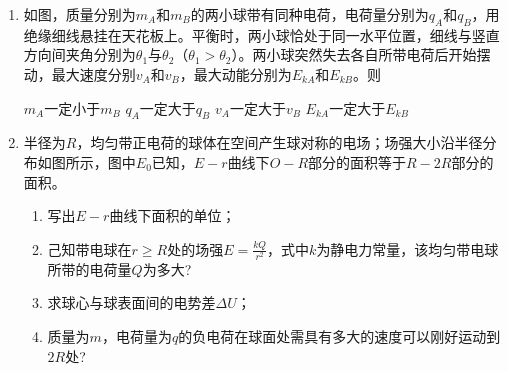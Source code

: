
\begin{enumerate}[leftmargin=0em]
\renewcommand{\labelenumi}{\arabic{enumi}.}
\item
{}
如图，质量分别为$ m_A $和$ m_B $的两小球带有同种电荷，电荷量分别为$ q_A $和$ q_B $，用绝缘细线悬挂在天花板上。平衡时，两小球恰处于同一水平位置，细线与竖直方向间夹角分别为$ \theta _1 $与$ \theta _2 $（$ \theta _1 > \theta _2 $）。两小球突然失去各自所带电荷后开始摆动，最大速度分别$ v_A $和$ v_B $，最大动能分别为$ E_{kA} $和$ E_{kB} $。则  
\begin{figure}[h!]
\centering

\end{figure}


\fourchoices
{$ m_A $一定小于$ m_B $ }
{$ q_A $一定大于$ q_B $}
{$ v_A $一定大于$ v_B $}
{$ E_{kA} $一定大于$ E_{kB} $}




\newpage
\item
{}
半径为$ R $，均匀带正电荷的球体在空间产生球对称的电场；场强大小沿半径分布如图所示，图中$ E_{0} $已知，$ E-r $曲线下$ O-R $部分的面积等于$ R-2R $部分的面积。
\begin{enumerate}
\renewcommand{\labelenumi}{\arabic{enumi}.}
\item
写出$ E - r $曲线下面积的单位；
\item 
己知带电球在$ r \geq R $处的场强$ E=\frac{kQ}{r^{2}} $，式中$ k $为静电力常量，该均匀带电球所带的电荷量$ Q $为多大?
\item 
求球心与球表面间的电势差$ \Delta U $；
\item 
质量为$ m $，电荷量为$ q $的负电荷在球面处需具有多大的速度可以刚好运动到$ 2R $处?


\end{enumerate}
\begin{figure}[h!]
\flushright

\end{figure}



\end{enumerate}
